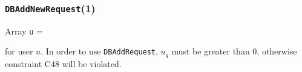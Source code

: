 \documentclass{article}
\theoremstyle{definition}
\begin{document}
\subsubsection{{\tt{}\protect{}DBAddNewRequest}(1)}
Array {\tt{}u} =


\noindent for user $u$. In order to use {\tt{}DBAddRequest}, $u_q$ must be
greater than 0, otherwise constraint C48 will be violated.
\end{document}
